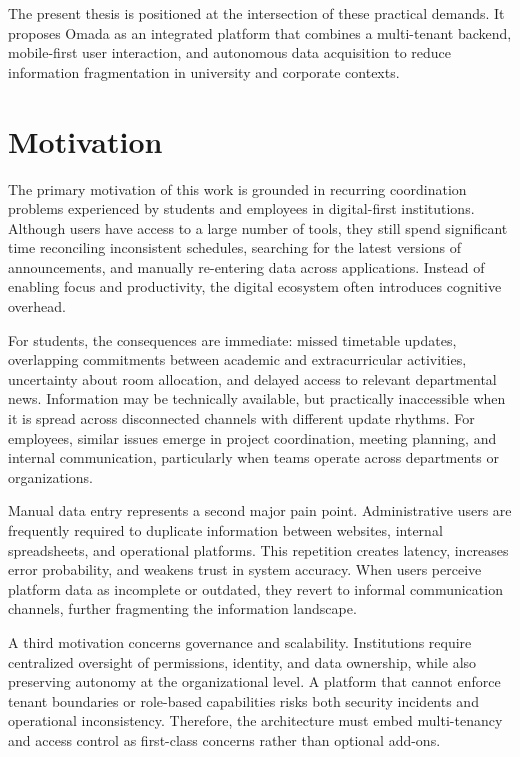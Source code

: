 The present thesis is positioned at the intersection of these practical demands. It proposes Omada as an integrated platform that combines a multi-tenant backend, mobile-first user interaction, and autonomous data acquisition to reduce information fragmentation in university and corporate contexts.

\section{Motivation}
The primary motivation of this work is grounded in recurring coordination problems experienced by students and employees in digital-first institutions. Although users have access to a large number of tools, they still spend significant time reconciling inconsistent schedules, searching for the latest versions of announcements, and manually re-entering data across applications. Instead of enabling focus and productivity, the digital ecosystem often introduces cognitive overhead.

For students, the consequences are immediate: missed timetable updates, overlapping commitments between academic and extracurricular activities, uncertainty about room allocation, and delayed access to relevant departmental news. Information may be technically available, but practically inaccessible when it is spread across disconnected channels with different update rhythms. For employees, similar issues emerge in project coordination, meeting planning, and internal communication, particularly when teams operate across departments or organizations.

Manual data entry represents a second major pain point. Administrative users are frequently required to duplicate information between websites, internal spreadsheets, and operational platforms. This repetition creates latency, increases error probability, and weakens trust in system accuracy. When users perceive platform data as incomplete or outdated, they revert to informal communication channels, further fragmenting the information landscape.

A third motivation concerns governance and scalability. Institutions require centralized oversight of permissions, identity, and data ownership, while also preserving autonomy at the organizational level. A platform that cannot enforce tenant boundaries or role-based capabilities risks both security incidents and operational inconsistency. Therefore, the architecture must embed multi-tenancy and access control as first-class concerns rather than optional add-ons.

